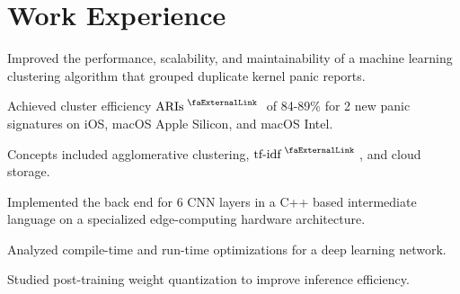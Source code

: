 \documentclass[]{deedy-resume-openfont}
\begin{document}
\begin{minipage}[t]{0.66\textwidth} 




\section{Work Experience}
\sectionsep

\vspace{\topsep} %
\begin{tightemize}
    \item Improved the performance, scalability, and maintainability of a machine learning clustering algorithm that grouped duplicate kernel panic reports.
    \item Achieved cluster efficiency \href{https://en.wikipedia.org/wiki/Rand_index#:~:text=(true\%20negatives).-,Adjusted\%20Rand\%20index,specified\%20by\%20a\%20random\%20model.}{$\link{ARIs}$} of 84-89\% for 2 new panic signatures on iOS, macOS Apple Silicon, and macOS Intel.
    \item Concepts included agglomerative clustering, \href{https://en.wikipedia.org/wiki/Tf\%E2\%80\%93idf#:~:text=In\%20information\%20retrieval\%2C\%20tf\%E2\%80\%93idf,in\%20a\%20collection\%20or\%20corpus.}{$\link{tf-idf}$}, and cloud storage.
\end{tightemize}
\sectionsep

\begin{tightemize}
    \item Implemented the back end for 6 CNN layers in a C++ based intermediate language on a specialized edge-computing hardware architecture.
    \item Analyzed compile-time and run-time optimizations for a deep learning network.
    \item Studied post-training weight quantization to improve inference efficiency.
\end{tightemize}
\sectionsep


\end{minipage}
\end{document}
